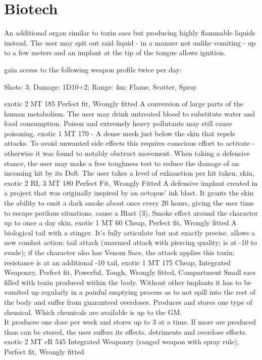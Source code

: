 \documentclass[12pt,a4paper,openany,usenames,dvipsnames]{book}
\begin{document}
    \section{Biotech}
        {An additional organ similar to toxin sacs but producing highly flammable liquids instead. The user may spit out said liquid - in a manner not unlike vomiting - up to a few meters and an implant at the tip of the tongue allows ignition.}
        {gain access to the following weapon profile twice per day:
    	\par\hspace*{10mm} Shots: 3; Damage: 1D10+2; Range: 4m; Flame, Scatter, Spray
        }
        {exotic}
        {2 MT}
        {185}
        {Perfect fit, Wrongly fitted}
        {A conversion of large parts of the human metabolism.}
        {The user may drink untreated blood to substitute water and food consumption. Poison and extremely heavy pollutants may still cause poisoning.}
        {exotic}
        {1 MT}
        {170}
        {-}
    	{A dense mesh just below the skin that repels attacks.
    		To avoid unwanted side effects this requires conscious effort to activate
    		- otherwise it was found to notably obstruct movement.}
    	{When taking a defensive stance, the user may make a free toughness test to reduce the damage of an incoming hit by its DoS. The user takes a level of exhaustion per hit taken.}
    	{skin, exotic}
    	{2 RI, 3 MT}
    	{180}
    	{Perfect Fit, Wrongly Fitted}
        {A defensive implant created in a project that was originally inspired by an octopus' ink blast. It grants the skin the ability to emit a dark smoke about once every 20 hours, giving the user time to escape perilous situations.}
        {cause a Blast (3), Smoke effect around the character up to once a day}
        {skin, exotic}
        {1 MT}
        {60}
        {Cheap, Perfect fit, Wrongly fitted}
        {A biological tail with a stinger. It's fully articulate but not exactly precise.}
        {allows a new combat action: tail attack (unarmed attack with piercing quality; is at -10 to evade); if the character also has Venom Sacs, the attack applies this toxin; resistance is at an additional -10}
        {tail, exotic}
        {1 MT}
        {175}
        {Cheap, Integrated Weaponry, Perfect fit, Powerful, Tough, Wrongly fitted, Compartment}
    	{Small sacs filled with toxin produced within the body.
    		Without other implants it has to be vomited up
    		regularly in a painful emptying process
    		as to not spill into the rest of the body
    		and suffer from guaranteed overdoses.}
    	{Produces and stores one type of chemical.
    		Which chemicals are available is up to the GM.
    		\\%
    		It produces one dose per week and stores up to 3 at a time.
    		If more are produced than can be stored,
    			the user suffers its effects, detriments and overdose effects.}
    	{exotic}
    	{2 MT}
    	{cR 545}
    	{Integrated Weaponry (ranged weapon with spray rule), Perfect fit, Wrongly fitted}
\end{document}
